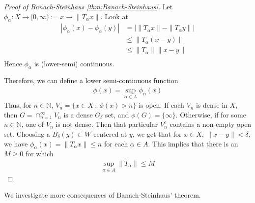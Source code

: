 \begin{proof}[Proof of Banach-Steinhaus \autoref{thm:Banach-Steinhaus}]
  \label{proof:Banach-Steinhaus}
  Let $\phi_\alpha: X \to [0, \infty):= x \to \|T_\alpha x\|$. Look at
  \begin{align*}
    |\phi_\alpha(x) - \phi_\alpha(y)| &= |\|T_\alpha x\| - \|T_\alpha y\|| \\
    &\le \|T_\alpha (x -y)\| \\
    &\le \| T_\alpha\| \|x - y\| \\
  \end{align*}
  Hence $\phi_\alpha$ is (lower-semi) continuous.

  Therefore, we can define a lower semi-continuous function
  \begin{align*}
    \phi(x) = \sup_{\alpha \in A} \phi_\alpha(x)
  \end{align*}
  Thus, for $n \in \mathbb{N}$, $V_n = \{ x \in X  \ : \  \phi(x) > n
  \}$ is open. If each $V_n$ is dense in $X$, then $G = \cap_{n =
  1}^{\infty} V_n$ is a dense $G_\delta$ set, and $\phi(G) = \{
  \infty \}$. Otherwise, if for some $n \in \mathbb{N}$, one of $V_n$
  is not dense. Then that particular $V_n^c$ contains a non-empty
  open set. Choosing a $B_\delta(y) \subset W$ centered at $y$, we
  get that for $x \in X$, $\|x - y\| < \delta$, we have
  $\phi_\alpha(x) = \|T_\alpha x\| \le n$ for each $\alpha \in A$.
  This implies that there is an $M \ge 0$ for which
  \begin{align*}
    \sup_{\alpha \in A} \|T_\alpha\| \le M
  \end{align*}
\end{proof}

We investigate more consequences of Banach-Steinhaus' theorem.

